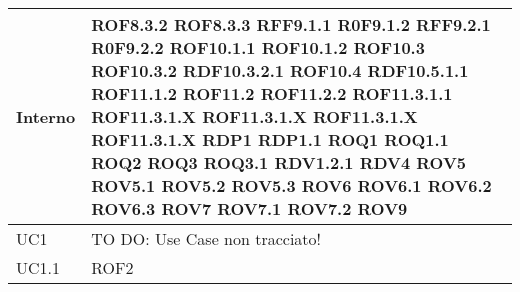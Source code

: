 \begin{center}
\begin{longtable}{| p{4cm} | p{4cm} |}
\hline
Interno & ROF8.3.2 \newline ROF8.3.3 \newline RFF9.1.1 \newline R0F9.1.2 \newline RFF9.2.1 \newline R0F9.2.2 \newline ROF10.1.1 \newline ROF10.1.2 \newline ROF10.3 \newline ROF10.3.2 \newline RDF10.3.2.1 \newline ROF10.4 \newline RDF10.5.1.1 \newline ROF11.1.2 \newline ROF11.2 \newline ROF11.2.2 \newline ROF11.3.1.1 \newline ROF11.3.1.X \newline ROF11.3.1.X \newline ROF11.3.1.X \newline ROF11.3.1.X \newline RDP1 \newline RDP1.1 \newline ROQ1 \newline ROQ1.1 \newline ROQ2 \newline ROQ3 \newline ROQ3.1 \newline RDV1.2.1 \newline RDV4 \newline ROV5 \newline ROV5.1 \newline ROV5.2 \newline ROV5.3 \newline ROV6 \newline ROV6.1 \newline ROV6.2 \newline ROV6.3 \newline ROV7 \newline ROV7.1 \newline ROV7.2 \newline ROV9 \newline \\
\hline
UC1 & TO DO: Use Case non tracciato! \\
\hline
UC1.1 & ROF2 \\

\end{longtable}
\end{center}
